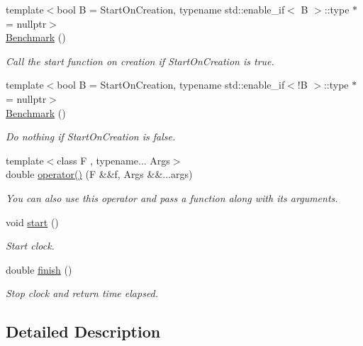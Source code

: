 \begin{DoxyCompactItemize}
\item 
{\footnotesize template$<$bool B = Start\+On\+Creation, typename std\+::enable\+\_\+if$<$ B $>$\+::type $\ast$  = nullptr$>$ }\\\hyperlink{group__BenchmarkGroup_ga1ba032700225aabb43579c633d7838b1}{Benchmark} ()
\begin{DoxyCompactList}\small\item\em Call the start function on creation if {\ttfamily Start\+On\+Creation} is {\ttfamily true}. \end{DoxyCompactList}\item 
{\footnotesize template$<$bool B = Start\+On\+Creation, typename std\+::enable\+\_\+if$<$!\+B $>$\+::type $\ast$  = nullptr$>$ }\\\hyperlink{classhandy_1_1impl_1_1Benchmark_ga1ba032700225aabb43579c633d7838b1}{Benchmark} ()
\begin{DoxyCompactList}\small\item\em Do nothing if {\ttfamily Start\+On\+Creation} is {\ttfamily false}. \end{DoxyCompactList}\item 
{\footnotesize template$<$class F , typename... Args$>$ }\\double \hyperlink{group__BenchmarkGroup_ga5eee042d87e75a24021ad6851a2c10ec}{operator()} (F \&\&f, Args \&\&...args)
\begin{DoxyCompactList}\small\item\em You can also use this operator and pass a function along with its arguments. \end{DoxyCompactList}\item 
void \hyperlink{group__BenchmarkGroup_gac7a583bb5a04f8028b8cc71a7db8fe80}{start} ()
\begin{DoxyCompactList}\small\item\em Start clock. \end{DoxyCompactList}\item 
double \hyperlink{group__BenchmarkGroup_ga1d7b23a0eeb6280431e0265cbdac1962}{finish} ()
\begin{DoxyCompactList}\small\item\em Stop clock and return time elapsed. \end{DoxyCompactList}\end{DoxyCompactItemize}


\subsection{Detailed Description}
